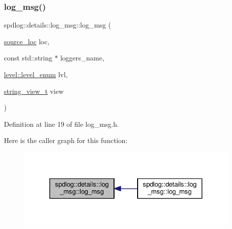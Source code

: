 \subsubsection{\texorpdfstring{log\+\_\+msg()}{log\_msg()}\hspace{0.1cm}{\footnotesize\ttfamily [1/3]}}
{\footnotesize\ttfamily spdlog\+::details\+::log\+\_\+msg\+::log\+\_\+msg (\begin{DoxyParamCaption}\item[{\hyperlink{structspdlog_1_1source__loc}{source\+\_\+loc}}]{loc,  }\item[{const std\+::string $\ast$}]{loggers\+\_\+name,  }\item[{\hyperlink{namespacespdlog_1_1level_a35f5227e5daf228d28a207b7b2aefc8b}{level\+::level\+\_\+enum}}]{lvl,  }\item[{\hyperlink{namespacespdlog_af48e310b2f366ac6544701e6a3b56247}{string\+\_\+view\+\_\+t}}]{view }\end{DoxyParamCaption})\hspace{0.3cm}{\ttfamily [inline]}}



Definition at line 19 of file log\+\_\+msg.\+h.

Here is the caller graph for this function\+:
\nopagebreak
\begin{figure}[H]
\begin{center}
\leavevmode
\includegraphics[width=312pt]{structspdlog_1_1details_1_1log__msg_af08273268386a97a4e4a02505f830318_icgraph}
\end{center}
\end{figure}
\mbox{\label{structspdlog_1_1details_1_1log__msg_aed741a89e884b8f51db4fd6364402e7a}} 
